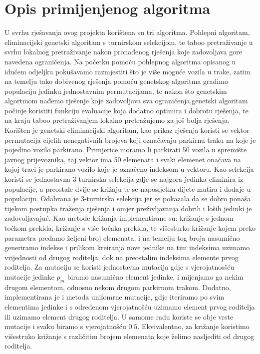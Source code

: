 \documentclass[11pt]{article}
\begin{document}
\section{Opis primijenjenog algoritma}
U svrhu rješavanja ovog projekta korištena su tri algoritma. Pohlepni algoritam, eliminacijski genetski algoritam s turnirskom selekcijom, te taboo pretraživanje u svrhu lokalnog pretraživanje nakon pronađenog rješenja koje zadovoljava gore navedena ograničenja. Na početku pomoću pohlepnog algoritma opisanog u idućem odjeljku pokušavamo razmjestiti što je više moguće vozila u trake, zatim na temelju tako dobivenog rješenja pomoću genetskog algoritma gradimo populaciju jedinku jednostavnim permutacijama, te nakon što genetskim algortmom nađemo rješenje koje zadovoljava sva ograničenja,genetski algoritam počinje koristiti funkciju evaluacije koja dodatno optimira i dobrotu rješenja, te na kraju taboo pretraživanjem lokalno pretražujemo za još bolja rješenja. Korišten je genetski eliminacijski algoritam, kao prikaz rješenja koristi se vektor permutacija cijelih nenegativnih brojeva koji označavaju parkirnu traku na koje je pojedino vozilo parkirano. Primjerice moramo li parkirati 50 vozila u spremište javnog prijevoznika, taj vektor ima 50 elemenata i svaki elemenet onačava na kojoj traci je parkirano vozilo koje je označeno indeksom u vektoru. Kao selekcija koristi se jednostavna 3-turnirska selekcija gdje se najgora jedinka eliminira iz populacije, a preostale dvije se križaju te se naposljetku dijete mutira i dodaje u populaciju. Odabrana je 3-turnirska selekcija jer se pokazala da se dobro ponaša tijekom postupka traženja rješenja i omjer preživljavanja dobrih i loših jedinki je zadovoljavajuć. Kao metode križanja implementirane su: križanje s jednom točkom prekida, križanje s više točaka prekida, te  višesturko križanje kojem preko parametra predamo željeni broj elemenata, i na temelju tog broja nasumično generiramo indekse i prilikom kreiranja nove jednike na tim indeksima uzimamo vrijednosti od drugog roditelja, dok na preostalim indeksima elemente prvog roditelja. Za mutaciju se koristi jednostavna mutacija gdje s vjerojatnosšću mutacije jedinke $p_m$ biramo nasumično element jedinke, i mijenjamo ga nekim drugom elementom, odnosno nekom drugom parkirnom trakom. Dodatno, implementirana je i metoda unifomrne mutacije, gdje iteriramo po svim elementima jedinke i s određenom vjerojatnošću uzimamo element prvog roditelja ili uzimamo element drugog roditelja. U samome radu koriste se obje vrste mutacije i svaku biramo s vjerojatnošću $0.5$. Ekvivalentno, za križanje koristimo višestruko križanje s različitim brojem elemenata koje želimo nasljediti od drugog roditelja. 
\end{document}
